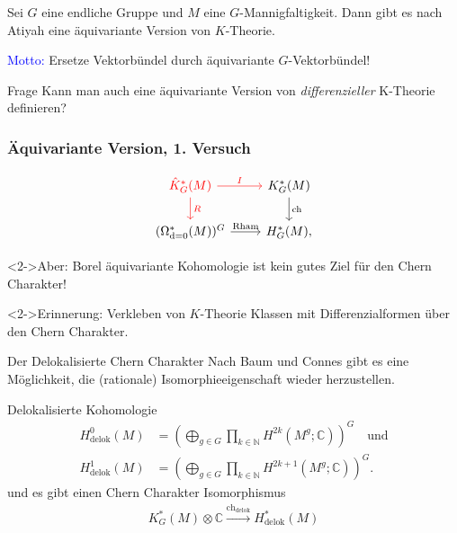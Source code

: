 \documentclass[12pt,utf8,notheorems,compress,t]{beamer}
\renewcommand{\_}{\mathpunct{.}}
\newcommand{\?}{\,{:}\,}
\newcommand{\dd}{\textup{d}}
\newcommand{\CC}{\mathbb{C}}
\newcommand{\N}{\mathbb{N}}
\begin{document}
\begin{frame}
    Sei $G$ eine endliche Gruppe und $M$ eine $G$-Mannigfaltigkeit. Dann gibt es
    nach Atiyah eine äquivariante Version von $K$-Theorie.
    
    \textcolor{blue}{Motto:} Ersetze Vektorbündel durch äquivariante
    $G$-Vektorbündel!
    \begin{block}{Frage}
        Kann man auch eine äquivariante Version von
        \emph{differenzieller} K-Theorie definieren?
    \end{block}
\end{frame}

\begin{frame}\frametitle{Äquivariante Version, 1. Versuch}
\begin{equation}\begin{tikzcd}[ampersand replacement=\&]
        \textcolor{red}{\hat K_G^*(M)} \arrow[d,
        "R", red]\arrow[r, "I", red] \& K_G^*(M)\arrow[d, "\mathrm{ch}"] \\ 
        (\Omega^*_{\dd=0}(M))^G \arrow[r, "\mathrm{Rham}"]\& H_G^*(M),
\end{tikzcd}\nonumber
\end{equation}
\begin{alertblock}<2->{Aber:}
    Borel äquivariante Kohomologie ist kein gutes Ziel für den Chern Charakter!
\end{alertblock}
\begin{block}<2->{Erinnerung:}
    Verkleben von $K$-Theorie Klassen mit Differenzialformen über den Chern
    Charakter. 
\end{block}
\end{frame}
\begin{frame}{Der Delokalisierte Chern Charakter}
    Nach Baum und Connes gibt es eine Möglichkeit, die (rationale)
    Isomorphieeigenschaft wieder herzustellen.
    \begin{block}{Delokalisierte Kohomologie}
        \vspace{-1em}
        \begin{align*}
            H^0_\mathrm{delok}(M) &= \left( \bigoplus_{g\in G} \prod_{k\in\N}
            H^{2k}(M^g;\CC)\right)^G\quad\mathrm{und}\\
            H^1_\mathrm{delok}(M) &= \left( \bigoplus_{g\in G} \prod_{k\in\N}
            H^{2k+1}(M^g;\CC)\right)^G.
        \end{align*}
        und es gibt einen Chern Charakter Isomorphismus
        \begin{align*}
            K_G^*(M)\otimes \CC
            \stackrel{\mathrm{ch}_{\mathrm{delok}}}{\longrightarrow}
            H_\mathrm{delok}^*(M)
        \end{align*}
    \end{block}
\end{frame}
\end{document}
